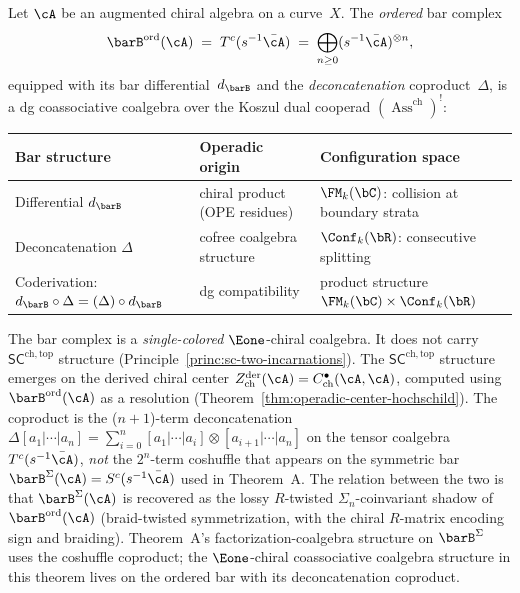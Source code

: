 \begin{theorem}
\label{thm:bar-swiss-cheese}%
\label{thm:bar-e1-coalgebra}
Let $\cA$ be an augmented chiral algebra on a curve~$X$. The
\emph{ordered} bar complex
\[
\barB^{\mathrm{ord}}(\cA)
\;=\; T^c(s^{-1}\bar{\cA})
\;=\; \bigoplus_{n\geq 0}
 (s^{-1}\bar{\cA})^{\otimes n},
\]
equipped with its bar differential~$d_{\barB}$ and the
\emph{deconcatenation} coproduct~$\Delta$, is a dg coassociative
coalgebra over the Koszul dual cooperad
$(\operatorname{Ass}^{\mathrm{ch}})^{\scriptstyle !}$:
\begin{center}
\small
\renewcommand{\arraystretch}{1.15}
\begin{tabular}{lll}
\textbf{Bar structure} & \textbf{Operadic origin} &
 \textbf{Configuration space} \\
\hline
Differential $d_{\barB}$
 & chiral product (OPE residues)
 & $\FM_k(\bC)$: collision at boundary strata \\[2pt]
Deconcatenation $\Delta$
 & cofree coalgebra structure
 & $\Conf_k(\bR)$: consecutive splitting \\[2pt]
Coderivation: $d_{\barB} \circ \Delta
  = (\Delta) \circ d_{\barB}$
 & dg compatibility
 & product structure $\FM_k(\bC)\times\Conf_k(\bR)$
\end{tabular}
\end{center}
The bar complex is a \emph{single-colored} $\Eone$-chiral coalgebra.
It does not carry $\mathsf{SC}^{\mathrm{ch,top}}$ structure
\textup{(}Principle~\textup{\ref{princ:sc-two-incarnations}}\textup{)}.
The $\mathsf{SC}^{\mathrm{ch,top}}$ structure emerges on the
derived chiral center $Z^{\mathrm{der}}_{\mathrm{ch}}(\cA)
= C^{\bullet}_{\mathrm{ch}}(\cA, \cA)$, computed using
$\barB^{\mathrm{ord}}(\cA)$ as a resolution
\textup{(}Theorem~\textup{\ref{thm:operadic-center-hochschild}}\textup{)}.
The coproduct is the \textup{(}$n+1$\textup{)}-term
deconcatenation
$\Delta[a_1|\cdots|a_n] =
 \sum_{i=0}^{n}[a_1|\cdots|a_i]\otimes[a_{i+1}|\cdots|a_n]$
on the tensor coalgebra $T^c(s^{-1}\bar\cA)$, \emph{not} the
$2^n$-term coshuffle that appears on the symmetric bar
$\barB^{\Sigma}(\cA) = S^c(s^{-1}\bar\cA)$ used in
Theorem~\textup{A}. The relation between the two is that
$\barB^{\Sigma}(\cA)$ is recovered as the lossy
$R$-twisted $\Sigma_n$-coinvariant shadow of $\barB^{\mathrm{ord}}(\cA)$
\textup{(}braid-twisted symmetrization, with the chiral $R$-matrix
encoding sign and braiding\textup{)}. Theorem~\textup{A}'s
factorization-coalgebra structure on $\barB^{\Sigma}$ uses the
coshuffle coproduct; the $\Eone$-chiral coassociative coalgebra structure in this
theorem lives on the ordered bar with its deconcatenation
coproduct.
\end{theorem}

